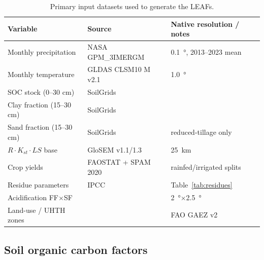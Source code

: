 \documentclass[11pt]{article}
\begin{document}
\begin{table}[t]
\centering
\caption{Primary input datasets used to generate the LEAFs.}
\label{tab:inputs}
\small
\begin{tabular}{@{}lll@{}}
\toprule
Variable & Source & Native resolution / notes \\
\midrule
Monthly precipitation & NASA GPM\_3IMERGM \citep{huffman2020} & \SI{0.1}{\degree}, 2013--2023 mean \\
Monthly temperature & GLDAS CLSM10 M v2.1 \citep{rodell2004} & \SI{1.0}{\degree} \\
SOC stock (0--30 cm) & SoilGrids \citep{poggio2021} & \\
Clay fraction (15--30 cm) & SoilGrids \citep{poggio2021} & \\
Sand fraction (15--30 cm) & SoilGrids \citep{poggio2021} & reduced-tillage only \\
$R\cdot K_{st}\cdot LS$ base & GloSEM v1.1/1.3 \citep{borrelli2017} & \SI{25}{\km} \\
Crop yields & FAOSTAT \citep{faostat} + SPAM 2020 \citep{spam2020} & rainfed/irrigated splits \\
Residue parameters & IPCC \citep{ipcc2006,ipcc2019} & Table~\ref{tab:residues} \\
Acidification FF$\times$SF & \citet{roy2014} & \SI{2}{\degree}$\times$\SI{2.5}{\degree} \\
Land-use / UHTH zones & \citet{morais2019} & FAO GAEZ v2 \\
\bottomrule
\end{tabular}
\end{table}

\subsection{Soil organic carbon factors}
\label{sec:soc}
\end{document}
